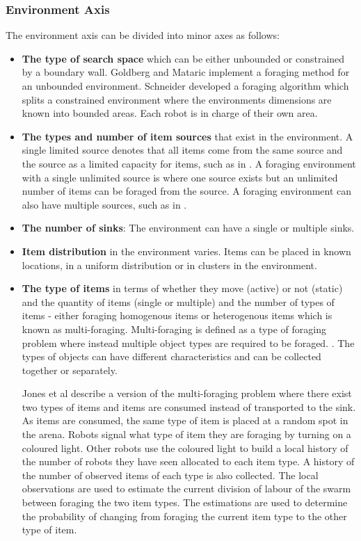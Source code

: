 \subsubsection{Environment Axis}
The environment axis can be divided into minor axes as follows:
\begin{itemize}
\item \textbf{The type of search space} which can be either unbounded or constrained by a boundary wall. Goldberg and Mataric \cite{Goldberg01designand} implement a foraging method for an unbounded environment. Schneider \cite{schneider1998territorial} developed a foraging algorithm which splits a constrained environment where the environments dimensions are known into bounded areas. Each robot is in charge of their own area.

\item \textbf{The types and number of item sources} that exist in the environment. A single limited source denotes that all items come from the same source and the source as a limited capacity for items, such as in \cite{sugawara2002swarming}. A foraging environment with a single unlimited source is where one source exists but an unlimited number of items can be foraged from the source. A foraging environment can also have multiple sources, such as in \cite{Goldberg01designand}. 

\item \textbf{The number of sinks}: The environment can have a single or multiple sinks. 

\item \textbf{Item distribution} in the environment varies. Items can be placed in known locations, in a uniform distribution or in clusters in the environment.

\item \textbf{The type of items} in terms of whether they move (active) or not (static) and the quantity of items (single or multiple) and the number of types of items - either foraging homogenous items or heterogenous items which is known as multi-foraging. Multi-foraging is defined as a type of foraging problem where instead multiple object types are required to be foraged. \cite{Balch99rewardand}. The types of objects can have different characteristics and can be collected together or separately.

Jones et al \cite{jones2003adaptive} describe a version of the multi-foraging problem where there exist two types of items and items are consumed instead of transported to the sink. As items are consumed, the same type of item is placed at a random spot in the arena. Robots signal what type of item they are foraging by turning on a coloured light. Other robots use the coloured light to build a local history of the number of robots they have seen allocated to each item type. A history of the number of observed items of each type is also collected. The local observations are used to estimate the current division of labour of the swarm between foraging the two item types. The estimations are used to determine the probability of changing from foraging the current item type to the other type of item. 


\end{itemize}
